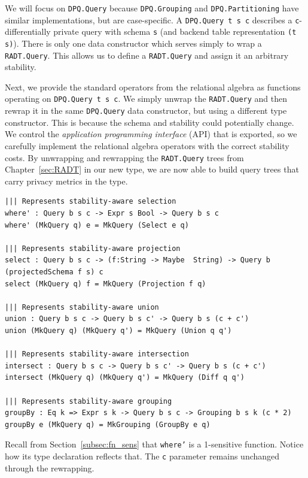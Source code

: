 \documentclass[12pt]{report}
\begin{document}
We will focus on \texttt{DPQ.Query} because \texttt{DPQ.Grouping} and \texttt{DPQ.Partitioning} have similar implementations, but are case-specific.
A \texttt{DPQ.Query t s c} describes a \texttt{c}-differentially private query with schema \texttt{s} (and backend table representation \texttt{(t s)}).
There is only one data constructor which serves simply to wrap a \texttt{RADT.Query}.
This allows us to define a \texttt{RADT.Query} and assign it an arbitrary stability.

Next, we provide the standard operators from the relational algebra as functions operating on \texttt{DPQ.Query t s c}.
We simply unwrap the \texttt{RADT.Query} and then rewrap it in the same \texttt{DPQ.Query} data constructor, but using a different type constructor.
This is because the schema and stability could potentially change.
We control the \textit{application programming interface} (API) that is exported, so we carefully implement the relational algebra operators with the correct stability costs.
By unwrapping and rewrapping the \texttt{RADT.Query} trees from Chapter~\ref{sec:RADT} in our new type, we are now able to build query trees that carry privacy metrics in the type.

\begin{lstlisting}[caption={Representing privacy-aware transformations},label={lst:transformations}]
||| Represents stability-aware selection
where' : Query b s c -> Expr s Bool -> Query b s c
where' (MkQuery q) e = MkQuery (Select e q)

||| Represents stability-aware projection
select : Query b s c -> (f:String -> Maybe  String) -> Query b (projectedSchema f s) c
select (MkQuery q) f = MkQuery (Projection f q)

||| Represents stability-aware union
union : Query b s c -> Query b s c' -> Query b s (c + c')
union (MkQuery q) (MkQuery q') = MkQuery (Union q q')

||| Represents stability-aware intersection
intersect : Query b s c -> Query b s c' -> Query b s (c + c')
intersect (MkQuery q) (MkQuery q') = MkQuery (Diff q q')

||| Represents stability-aware grouping
groupBy : Eq k => Expr s k -> Query b s c -> Grouping b s k (c * 2)
groupBy e (MkQuery q) = MkGrouping (GroupBy e q)
\end{lstlisting}

Recall from Section~\ref{subsec:fn_sens} that \texttt{where'} is a 1-sensitive function.
Notice how its type declaration reflects that.
The \texttt{c} parameter remains unchanged through the rewrapping.
\end{document}
